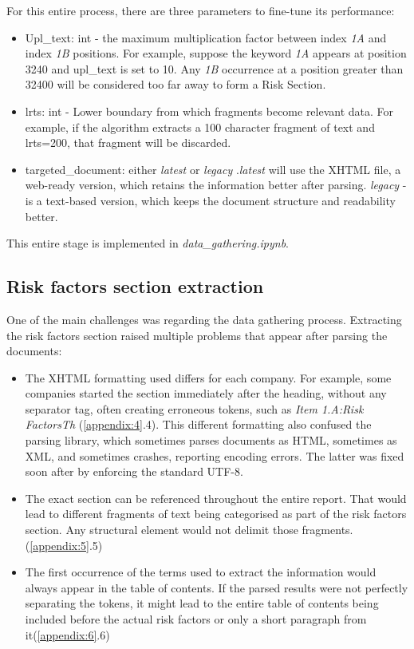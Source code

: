 \documentclass[12pt,MSc,a4paper,oneside]{muthesis}
\begin{document}
  For this entire process, there are three parameters to fine-tune its performance:
  \begin{itemize}
    \item Upl\_text: int - the maximum multiplication factor between index \textit{1A} and index \textit{1B} positions. For example, suppose the keyword \textit{1A} appears at position 3240 and upl\_text is set to 10. Any \textit{1B} occurrence at a position greater than 32400 will be considered too far away to form a Risk Section.
    \item lrts: int - Lower boundary from which fragments become relevant data. For example, if the algorithm extracts a 100 character fragment of text and lrts=200, that fragment will be discarded.
    \item targeted\_document: either \textit{latest} or \textit{legacy} .\textit{latest} will use the XHTML file, a web-ready version, which retains the information better after parsing. \textit{legacy} - is a text-based version, which keeps the document structure and readability better.
  \end{itemize}
  This entire stage is implemented in \textit{data\_gathering.ipynb}.

  \subsection{Risk factors section extraction}

  One of the main challenges was regarding the data gathering process. Extracting the risk factors section raised multiple problems that appear after parsing the documents:
  \begin{itemize}
    \item The XHTML formatting used differs for each company. For example, some companies started the section immediately after the heading, without any separator tag, often creating erroneous tokens, such as \textit{ Item 1.A:Risk FactorsTh} (\ref{appendix:4}.4). This different formatting also confused the parsing library, which sometimes parses documents as HTML, sometimes as XML, and sometimes crashes, reporting encoding errors. The latter was fixed soon after by enforcing the standard UTF-8.
    \item The exact section can be referenced throughout the entire report. That would lead to different fragments of text being categorised as part of the risk factors section. Any structural element would not delimit those fragments. (\ref{appendix:5}.5)
    \item The first occurrence of the terms used to extract the information would always appear in the table of contents. If the parsed results were not perfectly separating the tokens, it might lead to the entire table of contents being included before the actual risk factors or only a short paragraph from it(\ref{appendix:6}.6)
  \end{itemize}
\end{document}
